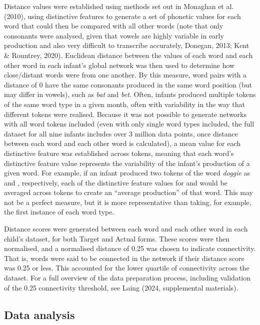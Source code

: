 \documentclass[
  man]{apa6}
\begin{document}
Distance values were established using methods set out in Monaghan et al. (2010), using distinctive features to generate a set of phonetic values for each word that could then be compared with all other words (note that only consonants were analysed, given that vowels are highly variable in early production and also very difficult to transcribe accurately, Donegan, 2013; Kent \& Rountrey, 2020). Euclidean distance between the values of each word and each other word in each infant's global network was then used to determine how close/distant words were from one another. By this measure, word pairs with a distance of 0 have the same consonants produced in the same word position (but may differ in vowels), such as \emph{bat} and \emph{bet}. Often, infants produced multiple tokens of the same word type in a given month, often with variability in the way that different tokens were realised. Because it was not possible to generate networks with all word tokens included (even with only single word types included, the full dataset for all nine infants includes over 3 million data points, once distance between each word and each other word is calculated), a mean value for each distinctive feature was established across tokens, meaning that each word's distinctive feature value represents the variability of the infant's production of a given word. For example, if an infant produced two tokens of the word \emph{doggie} as \textipa{[dAgi]} and \textipa{[dAti]}, respectively, each of the distinctive feature values for  and  would be averaged across tokens to create an ``average production'' of that word. This may not be a perfect measure, but it is more representative than taking, for example, the first instance of each word type.

Distance scores were generated between each word and each other word in each child's dataset, for both Target and Actual forms. These scores were then normalised, and a normalised distance of 0.25 was chosen to indicate connectivity. That is, words were said to be connected in the network if their distance score was 0.25 or less. This accounted for the lower quartile of connectivity across the dataset. For a full overview of the data preparation process, including validation of the 0.25 connectivity threshold, see Laing (2024, supplemental materials).

\subsection{Data analysis}\label{data-analysis}
\end{document}
